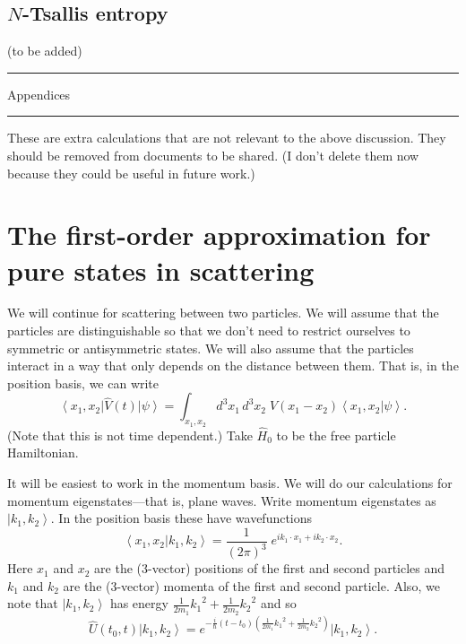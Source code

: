 \documentclass[11pt]{article}
\newcommand{\bra}[1]{\left\langle#1\right|}
\newcommand{\ket}[1]{\left|#1\right\rangle}
\newcommand{\braket}[2]{\left\langle#1|#2\right\rangle}
\newcommand{\op}[1]{\hat{#1}}
\theoremstyle{theorem}
\theoremstyle{remark}
\theoremstyle{step}
\theoremstyle{gap}
\begin{document}
\subsection{\(N\)-Tsallis entropy}

(to be added)


\appendix
\newpage
\hrule
\vspace{3em}
{\Huge Appendices}
\vspace{3em}
\hrule
\vspace{2em}

These are extra calculations that are not relevant to the above discussion. They should be removed from documents to be shared. (I don't delete them now because they could be useful in future work.)


\section{The first-order approximation for pure states in scattering}

We will continue for scattering between two particles. We will assume that the particles are distinguishable so that we don't need to restrict ourselves to symmetric or antisymmetric states. We will also assume that the particles interact in a way that only depends on the distance between them. That is, in the position basis, we can write
\begin{equation}\label{eq.Vposbasis}
\bra{x_1, x_2}\op{V}(t)\ket{\psi} = \int_{x_1,x_2} {d^3 x_1 \,d^3x_2}\; V(x_1 - x_2) \braket{x_1, x_2}{\psi}.
\end{equation}
(Note that this is not time dependent.) Take \(\op{H}_0\) to be the free particle Hamiltonian.

It will be easiest to work in the momentum basis. We will do our calculations for momentum eigenstates---that is, plane waves. Write momentum eigenstates as \(\ket{k_1, k_2}\). In the position basis these have wavefunctions
\begin{equation}\label{eq.momentuminpos}
\braket{x_1, x_2}{k_1, k_2} = \frac{1}{(2\pi)^3}\;e^{ik_1\cdot x_1 + ik_2\cdot x_2}.
\end{equation}
Here \(x_1\) and \(x_2\) are the (3-vector) positions of the first and second particles and \(k_1\) and \(k_2\) are the (3-vector) momenta of the first and second particle. Also, we note that \(\ket{k_1, k_2}\) has energy \(\frac{1}{2m_1}{k_1}^2 + \frac{1}{2m_2}{k_2}^2\) and so
\begin{equation}
\label{eq.timeevonk}
\op{U}(t_0, t) \ket{k_1, k_2} = e^{-\frac{i}{\hbar}\left(t-t_0\right)\left(\frac{1}{2m_1}{k_1}^2 + \frac{1}{2m_2}{k_2}^2\right)} \ket{k_1, k_2}.
\end{equation}
\end{document}
